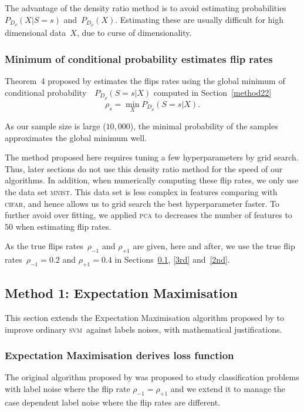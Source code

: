 \documentclass[12pt]{article} %
\newcommand{\svm}{\textsc{svm}}
\newcommand{\rhoo}{\rho_{+1}}
\newcommand{\rhoz}{\rho_{-1}}
\begin{document}
The advantage of the density ratio method is to avoid estimating probabilities~${P_{D_\rho}(X|S=s)}$ and~${P_{D_\rho}(X)}$. Estimating these are usually difficult for high dimensional data~$X$, due to curse of dimensionality.


\subsubsection{Minimum of conditional probability estimates flip rates}\label{method23}
Theorem~4 proposed by \citet{liu2016classification} estimates the flips rates using the global minimum of conditional probability~~$P_{D_\rho}(S=s|X)$ computed in Section~\ref{method22}
\begin{equation*}\label{eq:fliprate}
\rho_s=\min _X P_{D_\rho}(S=s|X).
\end{equation*}

As our sample size is large ($10,000$), the minimal probability of the samples approximates the global minimum well.

The method proposed here requires tuning a few hyperparameters by grid search. Thus, later sections do not use this density ratio method for the speed of our algorithms.
In addition, when numerically computing these flip rates, we only use the data set \textsc{mnist}. This data set is less complex in features comparing with \textsc{cifar}, and hence allows us to grid search the best hyperparameter faster. To further avoid over fitting, we applied \textsc{pca} to decreases the number of features to $50$ when estimating flip rates.

As the true flips rates~$\rhoz$ and $\rhoo$ are given, here and after, we use the true flip rates~$\rhoz=0.2$ and $\rhoo=0.4$ in Sections~\ref{1st}, \ref{3rd} and~\ref{2nd}.


\subsection{Method 1: Expectation Maximisation}\label{1st}
This section extends the Expectation Maximisation algorithm proposed by \citet{pmlr-v20-biggio11} to improve ordinary \svm\ against labels noises, with mathematical justifications.
\subsubsection{Expectation Maximisation derives loss function}
The original algorithm proposed by \citet{pmlr-v20-biggio11} was proposed to study classification problems with label noise where the flip rate $\rhoz=\rhoo$ and we extend it to manage the case dependent label noise where the flip rates are different.
\end{document}
